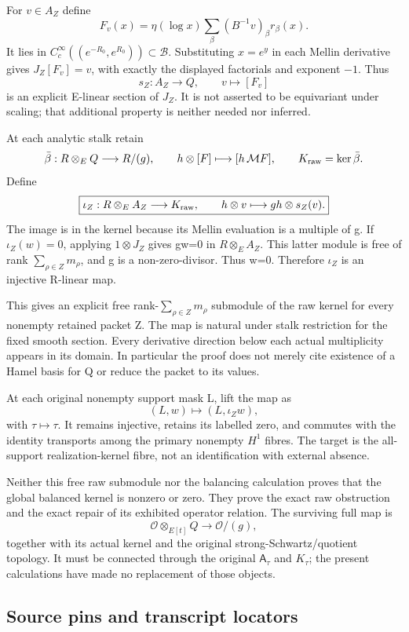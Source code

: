 For \(v\in A_Z\) define \[
F_v(x)=\eta(\log x)\sum_\beta(B^{-1}v)_\beta r_\beta(x).
\] It lies in \(C_c^\infty((e^{-R_0},e^{R_0}))\subset\mathscr B\). Substituting \(x=e^y\) in each Mellin derivative gives \(J_Z[F_v]=v\), with exactly the displayed factorials and exponent \(-1\). Thus \[
s_Z:A_Z\longrightarrow Q,\qquad v\longmapsto[F_v]
\] is an explicit E-linear section of \(J_Z\). It is not asserted to be equivariant under scaling; that additional property is neither needed nor inferred.

At each analytic stalk retain \[
\bar\beta:R\otimes_E Q\longrightarrow R/(g),\qquad
h\otimes[F]\longmapsto[h\,\mathcal MF],
\qquad K_{\rm raw}=\ker\bar\beta.
\] Define \[
\boxed{\iota_Z:R\otimes_E A_Z\longrightarrow K_{\rm raw},\qquad
h\otimes v\longmapsto gh\otimes s_Z(v).}
\] The image is in the kernel because its Mellin evaluation is a multiple of g. If \(\iota_Z(w)=0\), applying \(1\otimes J_Z\) gives gw=0 in \(R\otimes_E A_Z\). This latter module is free of rank \(\sum_{\rho\in Z}m_\rho\), and g is a non-zero-divisor. Thus w=0. Therefore \(\iota_Z\) is an injective R-linear map.

This gives an explicit free rank-\(\sum_{\rho\in Z}m_\rho\) submodule of the raw kernel for every nonempty retained packet Z. The map is natural under stalk restriction for the fixed smooth section. Every derivative direction below each actual multiplicity appears in its domain. In particular the proof does not merely cite existence of a Hamel basis for Q or reduce the packet to its values.

At each original nonempty support mask L, lift the map as \[
(L,w)\longmapsto(L,\iota_Zw),
\] with \(\tau\mapsto\tau\). It remains injective, retains its labelled zero, and commutes with the identity transports among the primary nonempty \(H^1\) fibres. The target is the all-support realization-kernel fibre, not an identification with external absence.

Neither this free raw submodule nor the balancing calculation proves that the global balanced kernel is nonzero or zero. They prove the exact raw obstruction and the exact repair of its exhibited operator relation. The surviving full map is \[
\mathcal O\otimes_{E[t]}Q\longrightarrow\mathcal O/(g),
\] together with its actual kernel and the original strong-Schwartz/quotient topology. It must be connected through the original \(\mathsf A_\tau\) and \(K_\tau\); the present calculations have made no replacement of those objects.

\subsection{Source pins and transcript locators}\label{proof06:typed-mellin:source-pins-and-transcript-locators}

